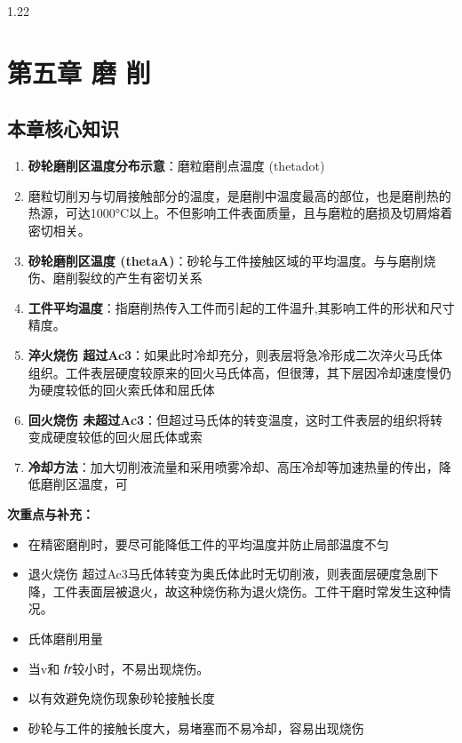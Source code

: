 \documentclass[12pt,a4paper]{article}
\begin{document}
\begin{spacing}{1.22}
\section{第五章 磨 削}
\subsection{本章核心知识}
\begin{tcolorbox}[colback=yellow!6,colframe=red!55!black,title=重点,left=1mm,right=1mm]
\begin{enumerate}[leftmargin=2.2em,label=\arabic*.]
  \item \textbf{砂轮磨削区温度分布示意}：磨粒磨削点温度 (thetadot)
  \item 磨粒切削刃与切屑接触部分的温度，是磨削中温度最高的部位，也是磨削热的热源，可达1000°C以上。不但影响工件表面质量，且与磨粒的磨损及切屑熔着密切相关。
  \item \textbf{砂轮磨削区温度 (thetaA)}：砂轮与工件接触区域的平均温度。与与磨削烧伤、磨削裂纹的产生有密切关系
  \item \textbf{工件平均温度}：指磨削热传入工件而引起的工件温升,其影响工件的形状和尺寸精度。
  \item \textbf{淬火烧伤 超过Ac3}：如果此时冷却充分，则表层将急冷形成二次淬火马氏体组织。工件表层硬度较原来的回火马氏体高，但很薄，其下层因冷却速度慢仍为硬度较低的回火索氏体和屈氏体
  \item \textbf{回火烧伤 未超过Ac3}：但超过马氏体的转变温度，这时工件表层的组织将转变成硬度较低的回火屈氏体或索
  \item \textbf{冷却方法}：加大切削液流量和采用喷雾冷却、高压冷却等加速热量的传出，降低磨削区温度，可
\end{enumerate}
\end{tcolorbox}
\noindent\textbf{次重点与补充：}
\begin{itemize}[leftmargin=2.2em,label=--]
  \item 在精密磨削时，要尽可能降低工件的平均温度并防止局部温度不匀
  \item 退火烧伤 超过Ac3马氏体转变为奥氏体此时无切削液，则表面层硬度急剧下降，工件表面层被退火，故这种烧伤称为退火烧伤。工件干磨时常发生这种情况。
  \item 氏体磨削用量
  \item 当v和 𝑓𝑟较小时，不易出现烧伤。
  \item 以有效避免烧伤现象砂轮接触长度
  \item 砂轮与工件的接触长度大，易堵塞而不易冷却，容易出现烧伤
\end{itemize}


\end{spacing}
\end{document}
